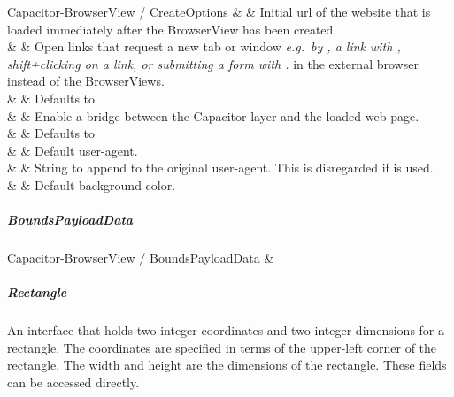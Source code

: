 \begin{interfacedesc}{Capacitor-BrowserView / CreateOptions}
                    &    & Initial \ac{url} of the website that is loaded immediately after the BrowserView has been created. \\ \hline
   &   & Open links that request a new tab or window \textit{e.g.\ by , a link with , shift+clicking on a link, or submitting a form with .} in the external browser instead of the BrowserViews. \\
                              &                             & Defaults to  \\ \hline
           &   & Enable a bridge between the Capacitor layer and the loaded web page. \\
                              &                             & Defaults to  \\ \hline
      &    & Default user-agent. \\ \hline
        &    & String to append to the original user-agent. This is disregarded if  is used. \\ \hline
        &     & Default background color. \\ \hline
\end{interfacedesc}


\subparagraph{BoundsPayloadData}

\begin{interface}{Capacitor-BrowserView / BoundsPayloadData}
   &  \\ \hline
\end{interface}


\newpage

\subparagraph{Rectangle}

An interface that holds two integer coordinates and two integer dimensions for a rectangle.
The coordinates are specified in terms of the upper-left corner of the rectangle.
The width and height are the dimensions of the rectangle.
These fields can be accessed directly.

